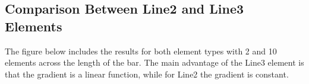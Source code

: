 \subsection{Comparison Between Line2 and Line3 Elements}
The figure below includes the results for both element types with 2 and 10 elements across the length of the bar. The main advantage of the Line3 element is that the gradient is a linear function, while for Line2 the gradient is constant.
\begin{figure}[ht!]
 \\
\end{figure}





